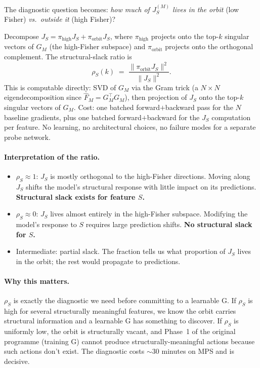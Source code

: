 \documentclass[11pt, a4paper]{article}
\theoremstyle{plain}
\theoremstyle{definition}
\theoremstyle{remark}
\begin{document}
The diagnostic question becomes: \emph{how much of $J_S^{(M)}$ lives in the orbit} (low Fisher) \emph{vs.\ outside it} (high Fisher)?

Decompose $J_S = \pi_{\text{high}} J_S + \pi_{\text{orbit}} J_S$, where $\pi_{\text{high}}$ projects onto the top-$k$ singular vectors of $G_M$ (the high-Fisher subspace) and $\pi_{\text{orbit}}$ projects onto the orthogonal complement.
The structural-slack ratio is
\begin{equation}
\rho_S(k) \;=\; \frac{\| \pi_{\text{orbit}} J_S \|^{2}}{\| J_S \|^{2}}.
\end{equation}
This is computable directly: SVD of $G_M$ via the Gram trick (a $N \times N$ eigendecomposition since $\hat{F}_M = G_M^{\!\top} G_M$), then projection of $J_S$ onto the top-$k$ singular vectors of $G_M$.
Cost: one batched forward$+$backward pass for the $N$ baseline gradients, plus one batched forward$+$backward for the $J_S$ computation per feature.
No learning, no architectural choices, no failure modes for a separate probe network.

\paragraph{Interpretation of the ratio.}
\begin{itemize}[nosep]
\item $\rho_S \approx 1$: $J_S$ is mostly orthogonal to the high-Fisher directions. Moving along $J_S$ shifts the model's structural response with little impact on its predictions. \textbf{Structural slack exists for feature $S$.}
\item $\rho_S \approx 0$: $J_S$ lives almost entirely in the high-Fisher subspace. Modifying the model's response to $S$ requires large prediction shifts. \textbf{No structural slack for $S$.}
\item Intermediate: partial slack. The fraction tells us what proportion of $J_S$ lives in the orbit; the rest would propagate to predictions.
\end{itemize}

\paragraph{Why this matters.}
$\rho_S$ is exactly the diagnostic we need before committing to a learnable G.
If $\rho_S$ is high for several structurally meaningful features, we know the orbit carries structural information and a learnable G has something to discover.
If $\rho_S$ is uniformly low, the orbit is structurally vacant, and Phase~1 of the original programme (training G) cannot produce structurally-meaningful actions because such actions don't exist.
The diagnostic costs $\sim$30 minutes on MPS and is decisive.
\end{document}
